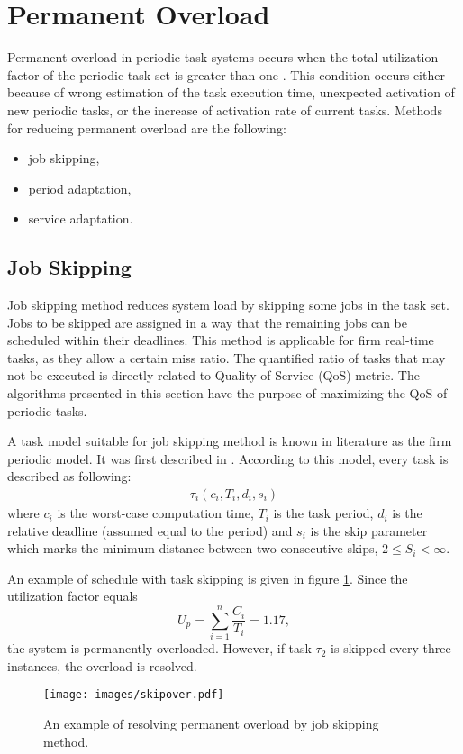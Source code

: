 \section{Permanent Overload}

Permanent overload in periodic task systems occurs when the total utilization factor of the periodic task set is greater than one \cite{buttazzo2011hard}. 
This condition occurs either because of wrong estimation of the task execution time, unexpected activation of new periodic tasks, or the increase of activation rate of current tasks.
Methods for reducing permanent overload are the following:
\begin{itemize}
	\item{job skipping,}
	\item{period adaptation,}
	\item{service adaptation.}
\end{itemize}

\subsection{Job Skipping}
\label{skip_algs}
Job skipping method reduces system load by skipping some jobs in the task set. Jobs to be skipped are assigned in a way that the remaining jobs can be scheduled within their deadlines.
This method is applicable for firm real-time tasks, as they allow a certain miss ratio. 
The quantified ratio of tasks that may not be executed is directly related to Quality of Service 
(QoS) metric. 
The algorithms presented in this section have the purpose of maximizing the QoS of periodic tasks.

A task model suitable for job skipping method is known in literature as the firm periodic model.
It was first described in \cite{koren1995skip}.
According to this model, every task is described as following:
\begin{align*}
\tau_i(c_i, T_i, d_i, s_i)
\end{align*}
where $c_i$ is the worst-case computation time, $T_i$ is the task period, $d_i$ is the relative deadline (assumed equal to the period) and $s_i$ is the skip parameter which marks the minimum distance between two consecutive skips, \(2 \leq S_i < \infty\).

An example of schedule with task skipping is given in figure \ref{skipover}. 
Since the utilization factor equals 
\begin{equation*}
U_p = \sum_{i=1}^{n} \frac{C_i}{T_i} = 1.17,
\end{equation*}
the system is permanently overloaded. 
However, if task \(\tau_2\) is skipped every three instances, the overload is resolved.
\\
\begin{figure}[ht]
    \centering
    \texttt{[image: images/skipover.pdf]}
    \caption{An example of resolving permanent overload by job skipping method.}
    \label{skipover}
\end{figure}

